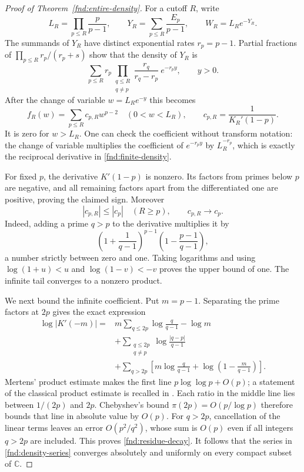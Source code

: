 \begin{proof}[Proof of Theorem~\ref{fnd:entire-density}]
For a cutoff $R$, write
\[
 L_R=\prod_{p\le R}\frac p{p-1},\qquad
 Y_R=\sum_{p\le R}\frac{E_p}{p-1},\qquad
 W_R=L_Re^{-Y_R}.
\]
The summands of $Y_R$ have distinct exponential rates $r_p=p-1$.
Partial fractions of $\prod_{p\le R}r_p/(r_p+s)$ show that
the density of $Y_R$ is
\[
 \sum_{p\le R}
 r_p\prod_{\substack{q\le R\\q\ne p}}
 \frac{r_q}{r_q-r_p}\ e^{-r_py},\qquad y>0.
\]
After the change of variable $w=L_Re^{-y}$ this becomes
\begin{equation}
 f_R(w)=\sum_{p\le R}c_{p,R}w^{p-2}\quad(0<w<L_R),
 \qquad c_{p,R}=\frac1{K_R'(1-p)}.
 \label{fnd:finite-density}
\end{equation}
It is zero for $w>L_R$.  One can check the coefficient without
transform notation: the change of variable multiplies the
coefficient of $e^{-r_py}$ by $L_R^{-r_p}$, which is exactly
the reciprocal derivative in \eqref{fnd:finite-density}.

For fixed $p$, the derivative $K'(1-p)$ is nonzero.  Its factors
from primes below $p$ are negative, and all remaining factors
apart from the differentiated one are positive, proving the
claimed sign.  Moreover
\begin{equation}
 |c_{p,R}|\le |c_p|\quad(R\ge p),\qquad c_{p,R}\longrightarrow c_p.
 \label{fnd:coefficient-domination}
\end{equation}
Indeed, adding a prime $q>p$ to the derivative multiplies it by
\[
 \left(1+\frac1{q-1}\right)^{p-1}
 \left(1-\frac{p-1}{q-1}\right),
\]
a number strictly between zero and one.  Taking logarithms and
using $\log(1+u)<u$ and $\log(1-v)<-v$ proves the upper bound
of one.  The infinite tail converges to a nonzero product.

We next bound the infinite coefficient.  Put $m=p-1$.  Separating
the prime factors at $2p$ gives the exact expression
\begin{align*}
 \log|K'(-m)|={}&m\sum_{q\le2p}\log\frac q{q-1}-\log m\\
 &+\sum_{\substack{q\le2p\\q\ne p}}
       \log\frac{|q-p|}{q-1}\\
 &+\sum_{q>2p}\left[m\log\frac q{q-1}
       +\log\left(1-\frac m{q-1}\right)\right].
\end{align*}
Mertens' product estimate makes the first line
$p\log\log p+O(p)$; a statement of the classical product
estimate is recalled in \cite[Section 2]{fndLagarias2002}.
Each ratio in the middle line lies between $1/(2p)$ and $2p$.
Chebyshev's bound $\pi(2p)=O(p/\log p)$ therefore bounds
that line in absolute value by $O(p)$.
For $q>2p$, cancellation of the linear terms leaves an error
$O(p^2/q^2)$, whose sum is $O(p)$ even if all integers $q>2p$
are included.  This proves \eqref{fnd:residue-decay}.  It follows
that the series in \eqref{fnd:density-series} converges absolutely
and uniformly on every compact subset of $\mathbb C$.


\end{proof}
